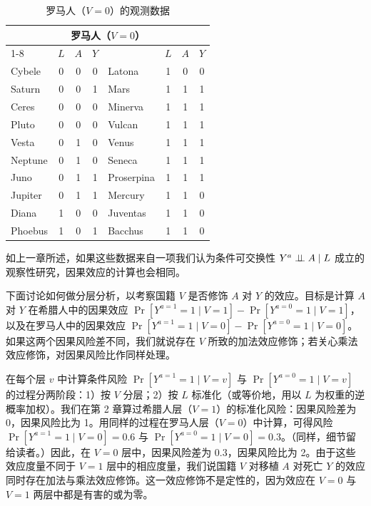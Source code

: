 \begin{table}[htbp]
\centering
\caption{罗马人（$V=0$）的观测数据}
\label{tab:4.2}
\small
\renewcommand{\arraystretch}{1.0}
\begin{tabular}{lccc@{\hspace{1.8em}}lccc}
\toprule
\multicolumn{8}{c}{罗马人（$V=0$）}\\
\cmidrule(lr){1-8}
 & $L$ & $A$ & $Y$ & & $L$ & $A$ & $Y$\\
\midrule
Cybele     & 0 & 0 & 0 & Latona     & 1 & 0 & 0\\
Saturn     & 0 & 0 & 1 & Mars       & 1 & 1 & 1\\
Ceres      & 0 & 0 & 0 & Minerva    & 1 & 1 & 1\\
Pluto      & 0 & 0 & 0 & Vulcan     & 1 & 1 & 1\\
Vesta      & 0 & 1 & 0 & Venus      & 1 & 1 & 1\\
Neptune    & 0 & 1 & 0 & Seneca     & 1 & 1 & 1\\
Juno       & 0 & 1 & 1 & Proserpina & 1 & 1 & 1\\
Jupiter    & 0 & 1 & 1 & Mercury    & 1 & 1 & 0\\
Diana      & 1 & 0 & 0 & Juventas   & 1 & 1 & 0\\
Phoebus    & 1 & 0 & 1 & Bacchus    & 1 & 1 & 0\\
\bottomrule
\end{tabular}
\end{table}

如上一章所述，如果这些数据来自一项我们认为条件可交换性 $Y^a\perp\!\!\!\perp A\mid L$ 成立的观察性研究，因果效应的计算也会相同。

下面讨论如何做分层分析，以考察国籍 $V$ 是否修饰 $A$ 对 $Y$ 的效应。目标是计算 $A$ 对 $Y$ 在希腊人中的因果效应 $\Pr[Y^{a=1}=1\mid V=1]-\Pr[Y^{a=0}=1\mid V=1]$，以及在罗马人中的因果效应 $\Pr[Y^{a=1}=1\mid V=0]-\Pr[Y^{a=0}=1\mid V=0]$。如果这两个因果风险差不同，我们就说存在 $V$ 所致的加法效应修饰；若关心乘法效应修饰，对因果风险比作同样处理。

在每个层 $v$ 中计算条件风险 $\Pr[Y^{a=1}=1\mid V=v]$ 与 $\Pr[Y^{a=0}=1\mid V=v]$ 的过程分两阶段：1）按 $V$ 分层；2）按 $L$ 标准化（或等价地，用以 $L$ 为权重的逆概率加权）。我们在第 2 章算过希腊人层（$V=1$）的标准化风险：因果风险差为 0，因果风险比为 1。用同样的过程在罗马人层（$V=0$）中计算，可得风险 $\Pr[Y^{a=1}=1\mid V=0]=0.6$ 与 $\Pr[Y^{a=0}=1\mid V=0]=0.3$。（同样，细节留给读者。）因此，在 $V=0$ 层中，因果风险差为 $0.3$，因果风险比为 2。由于这些效应度量不同于 $V=1$ 层中的相应度量，我们说国籍 $V$ 对移植 $A$ 对死亡 $Y$ 的效应同时存在加法与乘法效应修饰。这一效应修饰不是定性的，因为效应在 $V=0$ 与 $V=1$ 两层中都是有害的或为零。

